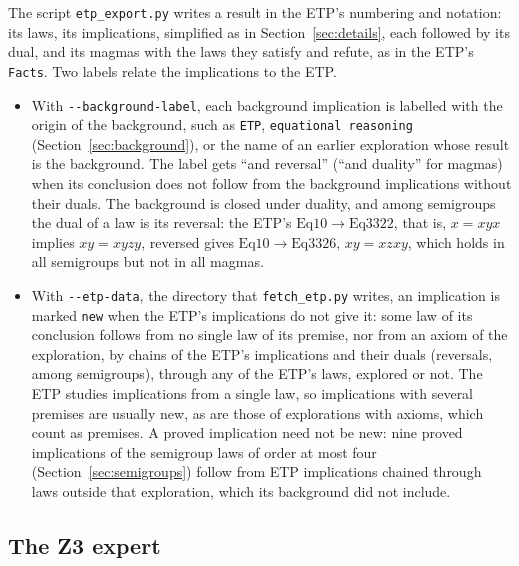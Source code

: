 \documentclass[11pt,a4paper]{article}
\theoremstyle{definition}
\theoremstyle{remark}
\newcommand{\code}[1]{\texttt{#1}}
\newcommand{\Eq}[1]{\mathrm{Eq}#1}
\begin{document}
The script \code{etp\_export.py} writes a result in the ETP's numbering and notation: its laws, its implications, simplified as in Section~\ref{sec:details}, each followed by its dual, and its magmas with the laws they satisfy and refute, as in the ETP's \code{Facts}. Two labels relate the implications to the ETP.
\begin{itemize}
  \item With \code{-{}-background-label}, each background implication is labelled with the origin of the background, such as \code{ETP}, \code{equational reasoning} (Section~\ref{sec:background}), or the name of an earlier exploration whose result is the background. The label gets ``and reversal'' (``and duality'' for magmas) when its conclusion does not follow from the background implications without their duals. The background is closed under duality, and among semigroups the dual of a law is its reversal: the ETP's $\Eq{10} \to \Eq{3322}$, that is, $x = xyx$ implies $xy = xyzy$, reversed gives $\Eq{10} \to \Eq{3326}$, $xy = xzxy$, which holds in all semigroups but not in all magmas.
  \item With \code{-{}-etp-data}, the directory that \code{fetch\_etp.py} writes, an implication is marked \code{new} when the ETP's implications do not give it: some law of its conclusion follows from no single law of its premise, nor from an axiom of the exploration, by chains of the ETP's implications and their duals (reversals, among semigroups), through any of the ETP's laws, explored or not. The ETP studies implications from a single law, so implications with several premises are usually new, as are those of explorations with axioms, which count as premises. A proved implication need not be new: nine proved implications of the semigroup laws of order at most four (Section~\ref{sec:semigroups}) follow from ETP implications chained through laws outside that exploration, which its background did not include.
\end{itemize}

\subsection{The Z3 expert}\label{sec:z3}
\end{document}
